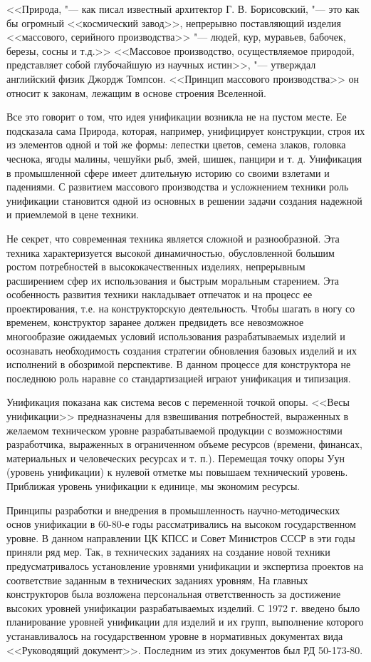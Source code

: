 <<Природа, "--- как писал известный архитектор Г. В. Борисовский, "--- это как бы огромный <<космический завод>>, непрерывно поставляющий изделия <<массового, серийного производства>> "--- людей, кур, муравьев, бабочек, березы, сосны и т.\:д.>> <<Массовое производство, осуществляемое природой, представляет собой глубочайшую из научных истин>>, "--- утверждал английский физик Джордж Томпсон. <<Принцип массового производства>> он относит к законам, лежащим в основе строения Вселенной.

Все это говорит о том, что идея унификации возникла не на пустом месте. Ее подсказала сама Природа, которая, например, унифицирует конструкции, строя их из элементов одной и той же формы: лепестки цветов, семена злаков, головка чеснока, ягоды малины, чешуйки рыб, змей, шишек, панцири и т. д. Унификация в промышленной сфере имеет длительную историю со своими взлетами и падениями. С развитием массового производства и усложнением техники роль унификации становится одной из основных в решении задачи создания надежной и приемлемой в цене техники.

Не секрет, что современная техника является сложной и разнообразной. Эта техника характеризуется высокой динамичностью, обусловленной большим ростом потребностей в высококачественных изделиях, непрерывным расширением сфер их использования и быстрым моральным старением. Эта особенность развития техники накладывает отпечаток и на процесс ее проектирования, т.\:е. на конструкторскую деятельность. Чтобы шагать в ногу со временем, конструктор заранее должен предвидеть все невозможное многообразие ожидаемых условий использования разрабатываемых изделий и осознавать необходимость создания стратегии обновления базовых изделий и их исполнений в обозримой перспективе. В данном процессе для конструктора не последнюю роль наравне со стандартизацией играют унификация и типизация.

Унификация показана как система весов с переменной точкой опоры. <<Весы унификации>> предназначены для взвешивания потребностей, выраженных в желаемом техническом уровне разрабатываемой продукции с возможностями разработчика, выраженных в ограниченном объеме ресурсов (времени, финансах, материальных и человеческих ресурсах и т. п.). Перемещая точку опоры Уун (уровень унификации) к нулевой отметке мы повышаем технический уровень. Приближая уровень унификации к единице, мы экономим ресурсы.

Принципы разработки и внедрения в промышленность научно-методических основ унификации в 60-80-е годы рассматривались на высоком государственном уровне. В данном направлении ЦК КПСС и Совет Министров СССР в эти годы приняли ряд мер. Так, в технических заданиях на создание новой техники предусматривалось установление уровнями унификации и экспертиза проектов на соответствие заданным в технических заданиях уровням, На главных конструкторов была возложена персональная ответственность за достижение высоких уровней унификации разрабатываемых изделий. С 1972 г. введено было планирование уровней унификации для изделий и их групп, выполнение которого устанавливалось на государственном уровне в нормативных документах вида <<Руководящий документ>>. Последним из этих документов был РД 50-173-80.

